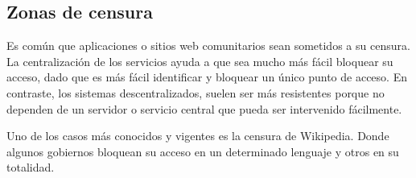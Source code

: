 \subsection{Zonas de censura}
Es común que aplicaciones o sitios web comunitarios sean sometidos a su censura. La centralización de los servicios ayuda a que sea mucho más fácil bloquear su acceso, dado que es más fácil identificar y bloquear un único punto de acceso. En contraste, los sistemas descentralizados, suelen ser más resistentes porque no dependen de un servidor o servicio central que pueda ser intervenido fácilmente.

Uno de los casos más conocidos y vigentes es la censura de Wikipedia. Donde algunos gobiernos bloquean su acceso en un determinado lenguaje y otros en su totalidad. \parencite{censorship-wikipedia}


